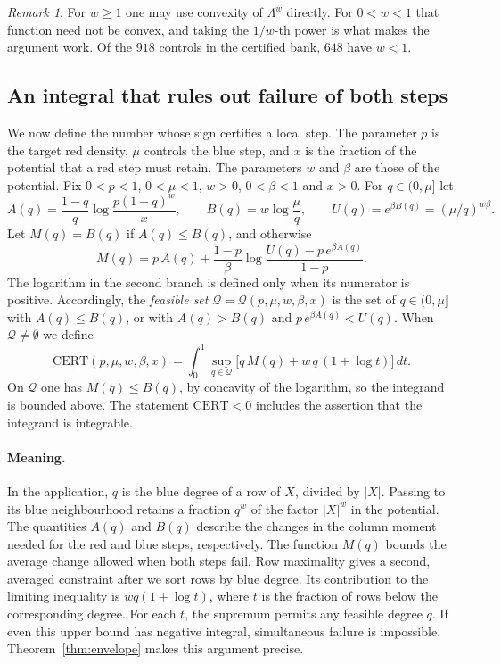 \documentclass[11pt]{article}
\theoremstyle{definition}
\theoremstyle{remark}
\newtheorem{remark}[theorem]{Remark}
\newcommand{\cert}{\mathrm{CERT}}
\newcommand{\feas}{\mathcal Q}
\begin{document}
\begin{remark}
For $w\ge1$ one may use convexity of $\Lambda^w$ directly. For $0<w<1$ that function need not be convex, and taking the
$1/w$-th power is what makes the argument work. Of the $918$ controls in the certified bank, $648$ have $w<1$.
\end{remark}

\subsection{An integral that rules out failure of both steps}

We now define the number whose sign certifies a local step. The parameter $p$ is the target red density,
$\mu$ controls the blue step, and $x$ is the fraction of the potential that a red step must retain.
The parameters $w$ and $\beta$ are those of the potential.
Fix $0<p<1$, $0<\mu<1$, $w>0$, $0<\beta<1$ and $x>0$. For $q\in(0,\mu]$ let
\[
A(q)=\frac{1-q}{q}\log\frac{p(1-q)^w}{x},\qquad B(q)=w\log\frac\mu q,\qquad U(q)=e^{\beta B(q)}=(\mu/q)^{w\beta}.
\]
Let $M(q)=B(q)$ if $A(q)\le B(q)$, and otherwise
\[
M(q)=p\,A(q)+\frac{1-p}\beta\log\frac{U(q)-p\,e^{\beta A(q)}}{1-p}.
\]
The logarithm in the second branch is defined only when its numerator is positive.
Accordingly, the \emph{feasible set} $\feas=\feas(p,\mu,w,\beta,x)$ is the set of $q\in(0,\mu]$ with $A(q)\le B(q)$, or with
$A(q)>B(q)$ and $p\,e^{\beta A(q)}<U(q)$. When $\feas\ne\emptyset$ we define
\[
\cert(p,\mu,w,\beta,x)=\int_0^1\sup_{q\in\feas}\Big[q\,M(q)+w\,q\,(1+\log t)\Big]\,dt.
\]
On $\feas$ one has $M(q)\le B(q)$, by concavity of the logarithm, so the integrand is bounded above. The statement
$\cert<0$ includes the assertion that the integrand is integrable.

\paragraph{Meaning.} In the application, $q$ is the blue degree of a row of $X$, divided by $|X|$.
Passing to its blue neighbourhood retains a fraction $q^w$ of the factor $|X|^w$ in the potential.
The quantities $A(q)$ and $B(q)$ describe the changes in the column moment needed for the red and blue steps,
respectively. The function $M(q)$ bounds the average change allowed when both steps fail.
Row maximality gives a second, averaged constraint after we sort rows by blue degree.
Its contribution to the limiting inequality is $wq(1+\log t)$, where $t$ is the fraction of rows below
the corresponding degree. For each $t$, the supremum permits any feasible degree $q$.
If even this upper bound has negative integral, simultaneous failure is impossible.
Theorem~\ref{thm:envelope} makes this argument precise.
\end{document}
